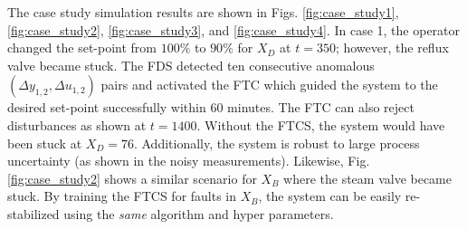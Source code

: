 The case study simulation results are shown in Figs. \ref{fig:case_study1}, \ref{fig:case_study2}, \ref{fig:case_study3}, and \ref{fig:case_study4}. In case 1, the operator changed the set-point from $100\%$ to $90\%$ for $X_D$ at $t = 350$; however, the reflux valve became stuck. The FDS detected ten consecutive anomalous $( \Delta y_{1, 2}, \Delta u_{1, 2})$ pairs and activated the FTC which guided the system to the desired set-point successfully within 60 minutes. The FTC can also reject disturbances as shown at $t = 1400$. Without the FTCS, the system would have been stuck at $X_D = 76$.  Additionally, the system is robust to large process uncertainty (as shown in the noisy measurements). Likewise, Fig. \ref{fig:case_study2} shows a similar scenario for $X_B$ where the steam valve became stuck.  By training the FTCS for faults in $X_B$, the system can be easily re-stabilized using the \textit{same} algorithm and hyper parameters.

